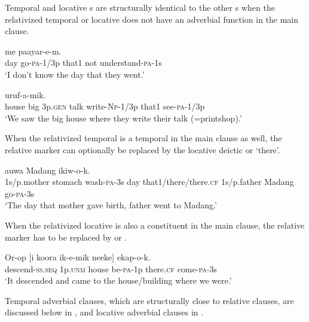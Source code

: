 Temporal and locative s are structurally identical to the other s when the relativized temporal or locative  does not have an adverbial function in the main clause. 

\ea%
\label{ex:8:x1554}
  me  paayar-e-m. \\
day  go-\textsc{pa}-1/3p  that1  not  understand-\textsc{pa}-1s\\
\glt`I don't know the day that they went.'
\z


\ea%
\label{ex:8:x1560}
  uruf-a-mik. \\
house  big  3p.\textsc{gen} talk  write-\textsc{Np}-1/3p that1  see-\textsc{pa}-1/3p\\
\glt`We saw the big house where they write their talk (=printshop).'
\z


When the relativized temporal  is a temporal in the main clause as well, the relative marker can optionally be replaced by the locative deictic  or  `there'.

\ea%
\label{ex:8:x1625}
 auwa  Madang  ikiw-o-k.\\
1s/p.mother  stomach  wash-\textsc{pa}-3s day that1/there/there.\textsc{cf} 1s/p.father Madang go-\textsc{pa}-3s\\
\glt`The day that mother gave birth, father went to Madang.'
\z


When the relativized locative  is also a constituent in the main clause, the relative marker has to be replaced by  or  .

\ea%
\label{ex:8:x1622}
\gll Or-op  [i  koora  ik-e-mik  neeke]  ekap-o-k.\\
descend-\textsc{ss}.\textsc{seq} 1p.\textsc{unm} house be-\textsc{pa}-1p there.\textsc{cf} come-\textsc{pa}-3s\\
\glt`It descended and came to the house/building where we were.'
\z


Temporal adverbial clauses, which are structurally close to relative clauses, are discussed below in , and locative adverbial clauses in .

